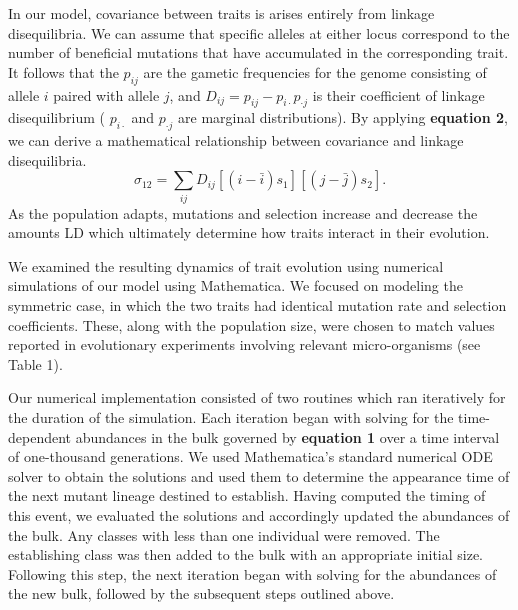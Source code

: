 \documentclass[9pt,twocolumn,twoside]{gsajnl}
\begin{document}
In our model, covariance between traits is arises entirely from linkage disequilibria. We can assume that specific alleles at either locus correspond to the number of beneficial mutations that have accumulated in the corresponding trait.  It follows that the $p_{ij}$ are the gametic frequencies for the genome consisting of allele $i$ paired with allele $j$, and $D_{ij} = p_{ij}-p_{i\cdot} p_{\cdot j}$ is their coefficient of linkage disequilibrium ( $p_{i\cdot}$ and $p_{\cdot j}$ are marginal distributions). By applying \textbf{equation 2}, we can derive a mathematical relationship between covariance and linkage disequilibria.
% 
% 
\begin{equation}
\sigma_{12}=\sum_{ij}D_{ij}[(i-\bar{i})s_1][(j-\bar{j})s_2]. 
\end{equation} 
As the population adapts, mutations and selection  increase and decrease the amounts LD which ultimately determine how traits interact in their evolution.\par

We examined the resulting dynamics of trait evolution using numerical simulations of our model using Mathematica. We focused on modeling the symmetric case, in which the two traits had identical mutation rate and selection coefficients. These, along with the population size, were chosen to match values reported in evolutionary experiments involving relevant micro-organisms (see Table 1). 

Our numerical implementation consisted of two routines which ran iteratively for the duration of the simulation. Each iteration began with solving for the time-dependent abundances in the bulk governed by \textbf{equation 1} over a time interval of one-thousand generations. We used Mathematica's standard numerical ODE solver to obtain the solutions and used them to determine the appearance time of the next mutant lineage destined to establish. Having computed the timing of this event, we evaluated the solutions and accordingly updated the abundances of the bulk. Any classes with less than one individual were removed.  The establishing class was then added to the bulk with an appropriate initial size. Following this step, the next iteration began with solving for the abundances of the new bulk, followed by the subsequent steps outlined above.\par
\end{document}
